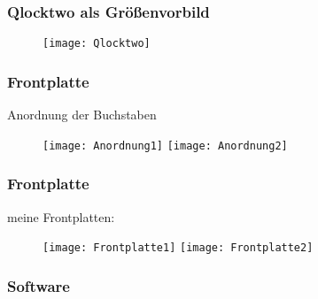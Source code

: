 \documentclass{beamer}
\begin{document}
\frame
{
  \frametitle{Qlocktwo als Größenvorbild}
\begin{figure}[tb]
\centering \texttt{[image: Qlocktwo]} 
\end{figure}
} 




 
 \frame
{
  \frametitle{Frontplatte}
  Anordnung der Buchstaben
  \begin{figure}
     \centering
     \texttt{[image: Anordnung1]}
     \texttt{[image: Anordnung2]}
\end{figure}
} 
 
\frame
{
  \frametitle{Frontplatte}
  meine Frontplatten:
  \begin{figure}
     \centering
     \texttt{[image: Frontplatte1]}
     \texttt{[image: Frontplatte2]}
\end{figure}
} 
 
 \frame
{
  \frametitle{Software}
  
} 
 
 
 
 
 
 
 
 
\end{document}
